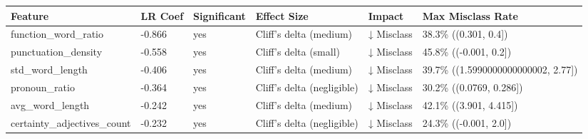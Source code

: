 \begin{tabular}{llllll}
\toprule
Feature & LR Coef & Significant & Effect Size & Impact & Max Misclass Rate \\
\midrule
function\_word\_ratio & -0.866 & yes & Cliff's delta (medium) & ↓ Misclass & 38.3\% ((0.301, 0.4]) \\
punctuation\_density & -0.558 & yes & Cliff's delta (small) & ↓ Misclass & 45.8\% ((-0.001, 0.2]) \\
std\_word\_length & -0.406 & yes & Cliff's delta (medium) & ↓ Misclass & 39.7\% ((1.5990000000000002, 2.77]) \\
pronoun\_ratio & -0.364 & yes & Cliff's delta (negligible) & ↓ Misclass & 30.2\% ((0.0769, 0.286]) \\
avg\_word\_length & -0.242 & yes & Cliff's delta (medium) & ↓ Misclass & 42.1\% ((3.901, 4.415]) \\
certainty\_adjectives\_count & -0.232 & yes & Cliff's delta (negligible) & ↓ Misclass & 24.3\% ((-0.001, 2.0]) \\
\bottomrule
\end{tabular}
